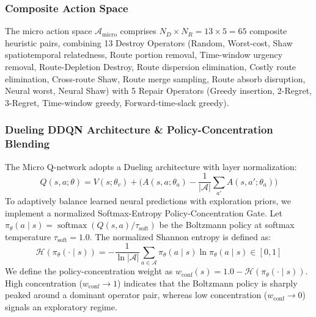 \documentclass{ieeeaccess}
\begin{document}
\subsubsection{Composite Action Space}
The micro action space $\mathcal{A}_{\text{micro}}$ comprises $N_D \times N_R = 13 \times 5 = 65$ composite heuristic pairs, combining 13 Destroy Operators (Random, Worst-cost, Shaw spatiotemporal relatedness, Route portion removal, Time-window urgency removal, Route-Depletion Destroy, Route dispersion elimination, Costly route elimination, Cross-route Shaw, Route merge sampling, Route absorb disruption, Neural worst, Neural Shaw) with 5 Repair Operators (Greedy insertion, 2-Regret, 3-Regret, Time-window greedy, Forward-time-slack greedy).

\subsubsection{Dueling DDQN Architecture \& Policy-Concentration Blending}
The Micro Q-network adopts a Dueling architecture \cite{wang2016dueling} with layer normalization:
\begin{equation}
  Q(s, a; \theta) = V(s; \theta_v) + \Big( A(s, a; \theta_a) - \frac{1}{|\mathcal{A}|} \sum_{a'} A(s, a'; \theta_a) \Big)
  \label{eq:dueling_q}
\end{equation}
To adaptively balance learned neural predictions with exploration priors, we implement a normalized Softmax-Entropy Policy-Concentration Gate. Let $\pi_{\theta}(a \mid s) = \operatorname{softmax}(Q(s, a)/\tau_{\text{soft}})$ be the Boltzmann policy at softmax temperature $\tau_{\text{soft}} = 1.0$. The normalized Shannon entropy is defined as:
\begin{equation}
  \mathcal{H}(\pi_{\theta}(\cdot \mid s)) = -\frac{1}{\ln |\mathcal{A}|} \sum_{a \in \mathcal{A}} \pi_{\theta}(a \mid s) \ln \pi_{\theta}(a \mid s) \in [0, 1]
  \label{eq:policy_entropy}
\end{equation}
We define the policy-concentration weight as $w_{\text{conf}}(s) = 1.0 - \mathcal{H}(\pi_{\theta}(\cdot \mid s))$. High concentration ($w_{\text{conf}} \to 1$) indicates that the Boltzmann policy is sharply peaked around a dominant operator pair, whereas low concentration ($w_{\text{conf}} \to 0$) signals an exploratory regime. 
\end{document}
